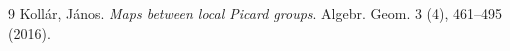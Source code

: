 \begin{thebibliography}{9}
Koll\'{a}r, J\'{a}nos.
\newblock \emph{Maps between local {P}icard groups}.
\newblock Algebr. Geom. 3 (4), 461--495 (2016).
\end{thebibliography}
